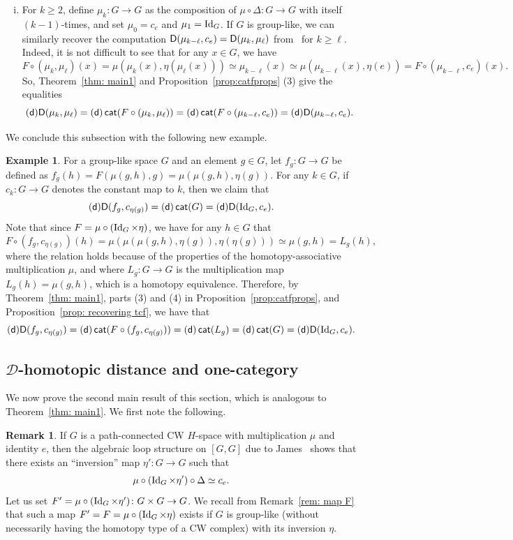 \documentclass[amscd,amssymb,verbatim,10pt]{amsart}
\numberwithin{equation}{section}
\theoremstyle{plain}
\theoremstyle{definition}
\newtheorem{remark}[theorem]{Remark}
\newtheorem{ex}[theorem]{Example}
\DeclareMathOperator{\cat}{{\mathsf{cat}}}
\def\id{\protect\operatorname{Id}}
\newcommand{\D}{{\sf {D}}}
\newcommand{\sd}{{(\sf {d})}}
\newcommand{\cD}{{\mathcal{D}}}
\begin{document}
\begin{enumerate}[(i)]
\item For $k\ge 2$, define $\mu_k\colon G\to G$ as the composition of $\mu\circ\Delta\colon G\to G$ with itself $(k-1)$-times, and set $\mu_0=c_e$ and $\mu_1=\id_G$. If $G$ is group-like, we can similarly recover the computation $\D(\mu_{k-\ell},c_e)=\D(\mu_k,\mu_{\ell})$ from~\cite{MM} for $k\ge\ell$. Indeed, it is not difficult to see that for any $x\in G$, we have
\[
F\circ (\mu_k,\mu_{\ell})(x)=\mu(\mu_k(x),\eta(\mu_\ell(x)))\simeq \mu_{k-\ell}(x)\simeq \mu(\mu_{k-\ell}(x),\eta(e))=F\circ (\mu_{k-\ell},c_e)(x).
\]
So, Theorem~\ref{thm: main1} and Proposition~\ref{prop:catfprops} (3) give the equalities
\[
\sd\D(\mu_k,\mu_\ell)=\sd\cat(F\circ (\mu_k,\mu_{\ell}))=\sd\cat(F\circ (\mu_{k-\ell},c_e))=\sd\D(\mu_{k-\ell},c_e).
\]
\end{enumerate}

We conclude this subsection with the following new example.

\begin{ex}\label{exam:conjdist}
For a group-like space $G$ and an element $g\in G$, let $f_g\colon G \to G$ be defined as $f_g(h)=F(\mu(g,h),g)=\mu(\mu(g,h),\eta(g))$.
For any $k\in G$, if $c_{k}\colon G\to G$ denotes the constant map to $k$, then we claim that
\[
\sd\D(f_g,c_{\eta(g)})=\sd\cat(G)=\sd\D(\id_G,c_e).
\]
Note that since $F=\mu\circ (\id_G\times\eta)$, we have for any $h\in G$ that
\[
F\circ (f_g,c_{\eta(g)})(h)=\mu(\mu(\mu(g,h),\eta(g)),\eta(\eta(g)))\simeq \mu(g,h)=L_g(h),
\]
where the relation holds because of the properties of the homotopy-associative multiplication $\mu$, and where $L_g\colon G\to G$ is the multiplication map $L_g(h)=\mu(g,h)$, which is a homotopy equivalence. Therefore, by Theorem~\ref{thm: main1}, parts (3) and (4) in Proposition~\ref{prop:catfprops}, and Proposition~\ref{prop: recovering tcf}, we have that
\[
\sd\D(f_g,c_{\eta(g)})=\sd\cat(F\circ (f_g,c_{\eta(g)}))=\sd\cat(L_g)=\sd\cat(G)=\sd\D(\id_G,c_e).
\]
\end{ex}

\subsection{$\cD$-homotopic distance and one-category}
We now prove the second main result of this section, which is analogous to Theorem~\ref{thm: main1}. We first note the following.

\begin{remark}\label{rem: new map F}
If $G$ is a path-connected CW $H$-space with multiplication $\mu$ and identity $e$, then the algebraic loop structure on $[G,G]$ due to James~\cite{James loop} shows that there exists an ``inversion'' map $\eta'\colon G\to G$ such that 
\[
\mu\circ (\id_G\times\eta')\circ\Delta\simeq c_e.
\]
Let us set $F'=\mu\circ (\id_G\times\eta')\colon G\times G\to G$. We recall from Remark~\ref{rem: map F} that such a map $F'=F=\mu\circ(\id_G\times\eta)$ exists if $G$ is group-like (without necessarily having the homotopy type of a CW complex) with its inversion $\eta$. 
\end{remark}
\end{document}
